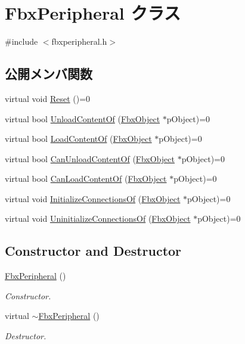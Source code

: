 \hypertarget{class_fbx_peripheral}{}\section{Fbx\+Peripheral クラス}
\label{class_fbx_peripheral}


{\ttfamily \#include $<$fbxperipheral.\+h$>$}

\subsection*{公開メンバ関数}
\begin{DoxyCompactItemize}
\item 
virtual void \hyperlink{class_fbx_peripheral_abda49f57236244f342a37d3fb04b476b}{Reset} ()=0
\item 
virtual bool \hyperlink{class_fbx_peripheral_a3ab3dba37ee2b8a4215229f9d11325b7}{Unload\+Content\+Of} (\hyperlink{class_fbx_object}{Fbx\+Object} $\ast$p\+Object)=0
\item 
virtual bool \hyperlink{class_fbx_peripheral_a14cbb095a9cfeefb3d217cbfe9f507a9}{Load\+Content\+Of} (\hyperlink{class_fbx_object}{Fbx\+Object} $\ast$p\+Object)=0
\item 
virtual bool \hyperlink{class_fbx_peripheral_ac1d217526c6b5de7f621ab7c5151f69e}{Can\+Unload\+Content\+Of} (\hyperlink{class_fbx_object}{Fbx\+Object} $\ast$p\+Object)=0
\item 
virtual bool \hyperlink{class_fbx_peripheral_a2cd1f044d656a2a8a40d86df3725b496}{Can\+Load\+Content\+Of} (\hyperlink{class_fbx_object}{Fbx\+Object} $\ast$p\+Object)=0
\item 
virtual void \hyperlink{class_fbx_peripheral_a8066995ba74b61a137646fae06341f3a}{Initialize\+Connections\+Of} (\hyperlink{class_fbx_object}{Fbx\+Object} $\ast$p\+Object)=0
\item 
virtual void \hyperlink{class_fbx_peripheral_ae7cd11b61456cfa33644ebf37870779c}{Uninitialize\+Connections\+Of} (\hyperlink{class_fbx_object}{Fbx\+Object} $\ast$p\+Object)=0
\end{DoxyCompactItemize}
\subsection*{Constructor and Destructor}
\begin{DoxyCompactItemize}
\item 
\hyperlink{class_fbx_peripheral_a46a788c258ad53fed8a716abc03d36c3}{Fbx\+Peripheral} ()
\begin{DoxyCompactList}\small\item\em Constructor. \end{DoxyCompactList}\item 
virtual \hyperlink{class_fbx_peripheral_aad41e072490022edaba6f3b7e11e0b5d}{$\sim$\+Fbx\+Peripheral} ()
\begin{DoxyCompactList}\small\item\em Destructor. \end{DoxyCompactList}\end{DoxyCompactItemize}


